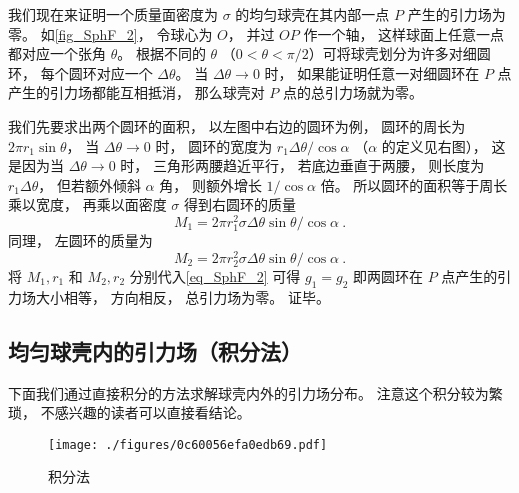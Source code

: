我们现在来证明一个质量面密度为 $\sigma$ 的均匀球壳在其内部一点 $P$ 产生的引力场为零。 如\autoref{fig_SphF_2}， 令球心为 $O$， 并过 $OP$ 作一个轴， 这样球面上任意一点都对应一个张角 $\theta$。 根据不同的 $\theta$ （$0 < \theta < \pi/2$）可将球壳划分为许多对细圆环， 每个圆环对应一个 $\Delta\theta$。 当 $\Delta\theta\to 0$ 时， 如果能证明任意一对细圆环在 $P$ 点产生的引力场都能互相抵消， 那么球壳对 $P$ 点的总引力场就为零。

我们先要求出两个圆环的面积， 以左图中右边的圆环为例， 圆环的周长为 $2\pi r_1\sin\theta$， 当 $\Delta\theta\to 0$ 时， 圆环的宽度为 $r_1\Delta\theta/\cos\alpha$ （$\alpha$ 的定义见右图）， 这是因为当 $\Delta \theta \to 0$ 时， 三角形两腰趋近平行， 若底边垂直于两腰， 则长度为 $r_1\Delta\theta$， 但若额外倾斜 $\alpha$ 角， 则额外增长 $1/\cos\alpha$ 倍。 所以圆环的面积等于周长乘以宽度， 再乘以面密度 $\sigma$ 得到右圆环的质量
\begin{equation}
M_1 = 2\pi r_1^2 \sigma \Delta\theta\sin\theta /\cos\alpha~.
\end{equation}
同理， 左圆环的质量为
\begin{equation}
M_2 = 2\pi r_2^2 \sigma \Delta\theta\sin\theta /\cos\alpha~.
\end{equation}
将 $M_1, r_1$ 和 $M_2, r_2$ 分别代入\autoref{eq_SphF_2} 可得 $g_1 = g_2$ 即两圆环在 $P$ 点产生的引力场大小相等， 方向相反， 总引力场为零。 证毕。

\subsection{均匀球壳内的引力场（积分法）}
下面我们通过直接积分的方法求解球壳内外的引力场分布。 注意这个积分较为繁琐， 不感兴趣的读者可以直接看结论。

\begin{figure}[ht]
\centering
\texttt{[image: ./figures/0c60056efa0edb69.pdf]}
\caption{积分法} \label{fig_SphF_3}
\end{figure}

